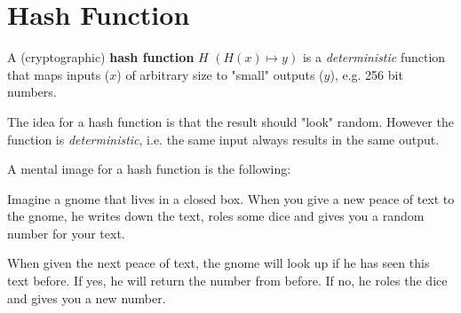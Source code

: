 
\section{Hash Function}


\begin{definition}
	A (cryptographic) \textbf{hash function} $H$ $(H(x) \mapsto y)$ is a \emph{deterministic} function that maps inputs ($x$) of arbitrary size to "small" outputs ($y$), e.g. 256 bit numbers.
\end{definition}
 
\begin{note}
The idea for a hash function is that the result should "look" random. 
However the function is \emph{deterministic}, i.e. the same input always results in the same output.
\end{note}

\begin{note}
A mental image for a hash function is the following:

Imagine a gnome that lives in a closed box. When you give a new peace of text to the gnome, he writes down the text, roles some dice and gives you a random number for your text.

When given the next peace of text, the gnome will look up if he has seen this text before. If yes, he will return the number from before. If no, he roles the dice and gives you a new number.
\end{note}

